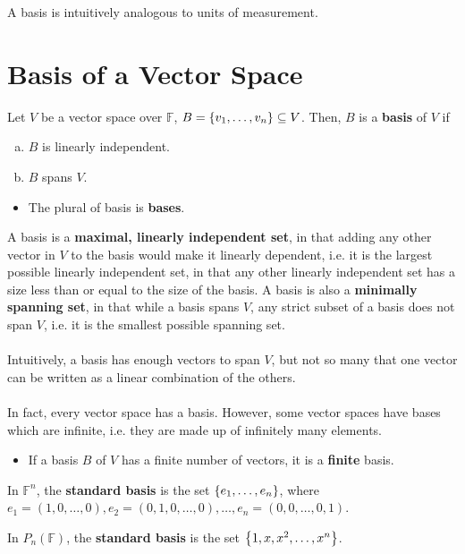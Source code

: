 \documentclass[letterpaper,12pt]{article}
\begin{document}
A basis is intuitively analogous to units of measurement.

\section*{Basis of a Vector Space}
\begin{definition}
Let $V$ be a vector space over $\mathbb{F}$, $B = \left\{ v_1, \dots, v_n \right\} \subseteq V$. Then, $B$ is a \textbf{basis} of $V$ if
\begin{enumerate}[(a)]
    \item $B$ is linearly independent.
    \item $B$ spans $V$.
\end{enumerate}
\begin{itemize}
    \item The plural of basis is \textbf{bases}.
\end{itemize}
\end{definition}
A basis is a \textbf{maximal, linearly independent set}, in that adding any other vector in $V$ to the basis would make it linearly dependent, i.e. it is the largest possible linearly independent set, in that any other linearly independent set has a size less than or equal to the size of the basis. A basis is also a \textbf{minimally spanning set}, in that while a basis spans $V$, any strict subset of a basis does not span $V$, i.e. it is the smallest possible spanning set.
\\ \\ Intuitively, a basis has enough vectors to span $V$, but not so many that one vector can be written as a linear combination of the others.
\\ \\ In fact, every vector space has a basis. However, some vector spaces have bases which are infinite, i.e. they are made up of infinitely many elements.
\begin{itemize}
    \item If a basis $B$ of $V$ has a finite number of vectors, it is a \textbf{finite} basis.
\end{itemize}

\begin{definition}
In $\mathbb{F}^n$, the \textbf{standard basis} is the set $\left\{ e_1, \dots, e_n \right\}$, where $e_1 = (1, 0, \dots, 0), e_2 = (0, 1, 0, \dots, 0), \dots, e_n = (0, 0, \dots, 0, 1)$.
\end{definition}

\begin{definition}
In $P_{n}(\mathbb{F})$, the \textbf{standard basis} is the set $\left\{ 1, x, x^2, \dots, x^n \right\}$.
\end{definition}
\end{document}
